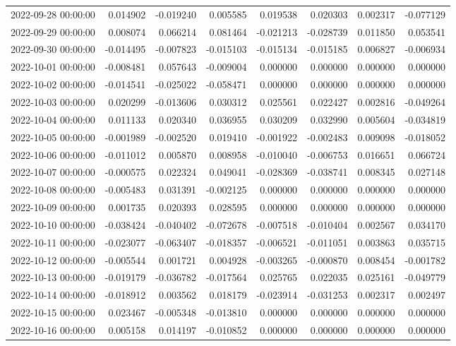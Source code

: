 \begin{tabular}{lrrrrrrr}
2022-09-28 00:00:00 & 0.014902 & -0.019240 & 0.005585 & 0.019538 & 0.020303 & 0.002317 & -0.077129 \\
2022-09-29 00:00:00 & 0.008074 & 0.066214 & 0.081464 & -0.021213 & -0.028739 & 0.011850 & 0.053541 \\
2022-09-30 00:00:00 & -0.014495 & -0.007823 & -0.015103 & -0.015134 & -0.015185 & 0.006827 & -0.006934 \\
2022-10-01 00:00:00 & -0.008481 & 0.057643 & -0.009004 & 0.000000 & 0.000000 & 0.000000 & 0.000000 \\
2022-10-02 00:00:00 & -0.014541 & -0.025022 & -0.058471 & 0.000000 & 0.000000 & 0.000000 & 0.000000 \\
2022-10-03 00:00:00 & 0.020299 & -0.013606 & 0.030312 & 0.025561 & 0.022427 & 0.002816 & -0.049264 \\
2022-10-04 00:00:00 & 0.011133 & 0.020340 & 0.036955 & 0.030209 & 0.032990 & 0.005604 & -0.034819 \\
2022-10-05 00:00:00 & -0.001989 & -0.002520 & 0.019410 & -0.001922 & -0.002483 & 0.009098 & -0.018052 \\
2022-10-06 00:00:00 & -0.011012 & 0.005870 & 0.008958 & -0.010040 & -0.006753 & 0.016651 & 0.066724 \\
2022-10-07 00:00:00 & -0.000575 & 0.022324 & 0.049041 & -0.028369 & -0.038741 & 0.008345 & 0.027148 \\
2022-10-08 00:00:00 & -0.005483 & 0.031391 & -0.002125 & 0.000000 & 0.000000 & 0.000000 & 0.000000 \\
2022-10-09 00:00:00 & 0.001735 & 0.020393 & 0.028595 & 0.000000 & 0.000000 & 0.000000 & 0.000000 \\
2022-10-10 00:00:00 & -0.038424 & -0.040402 & -0.072678 & -0.007518 & -0.010404 & 0.002567 & 0.034170 \\
2022-10-11 00:00:00 & -0.023077 & -0.063407 & -0.018357 & -0.006521 & -0.011051 & 0.003863 & 0.035715 \\
2022-10-12 00:00:00 & -0.005544 & 0.001721 & 0.004928 & -0.003265 & -0.000870 & 0.008454 & -0.001782 \\
2022-10-13 00:00:00 & -0.019179 & -0.036782 & -0.017564 & 0.025765 & 0.022035 & 0.025161 & -0.049779 \\
2022-10-14 00:00:00 & -0.018912 & 0.003562 & 0.018179 & -0.023914 & -0.031253 & 0.002317 & 0.002497 \\
2022-10-15 00:00:00 & 0.023467 & -0.005348 & -0.013810 & 0.000000 & 0.000000 & 0.000000 & 0.000000 \\
2022-10-16 00:00:00 & 0.005158 & 0.014197 & -0.010852 & 0.000000 & 0.000000 & 0.000000 & 0.000000 \\

\end{tabular}
